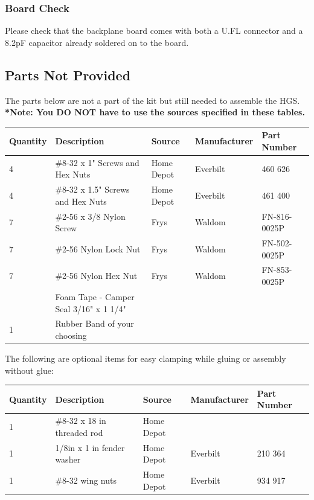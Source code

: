\documentclass[paper=a4,parskip=full+]{scrartcl}
\begin{document}
\subsubsection{Board Check}
Please check that the backplane board comes with both a U.FL connector and a 8.2pF capacitor already soldered on to the board. 

\subsection{Parts Not Provided}
The parts below are not a part of the kit but still needed to assemble the HGS.\\
\textbf{*Note: You DO NOT have to use the sources specified in these tables.}
\begin{table}[H]
    \footnotesize
    \begin{tabular}{|l|l|l|l|l|}
        \hline
        Quantity & Description & Source & Manufacturer & Part Number\\
        \hline
        \hline
        4 & \#8-32 x 1" Screws and Hex Nuts & Home Depot & Everbilt & 460 626 \\
        \hline
        4 & \#8-32 x 1.5" Screws and Hex Nuts & Home Depot & Everbilt & 461 400 \\
        \hline
        7 & \#2-56 x 3/8 Nylon Screw & Frys & Waldom & FN-816-0025P \\
        \hline
        7 & \#2-56 Nylon Lock Nut & Frys & Waldom & FN-502-0025P \\
        \hline
        7 & \#2-56 Nylon Hex Nut & Frys & Waldom & FN-853-0025P \\
        \hline
        & Foam Tape - Camper Seal 3/16" x 1 1/4" & & & \\
        \hline
        1 & Rubber Band of your choosing & & & \\
        \hline
        
    \end{tabular}
    \label{tab:my_label}
\end{table}

\noindent The following are optional items for easy clamping while gluing or assembly without glue:

\begin{table}[H]
    \footnotesize
    \begin{tabular}{|l|l|l|l|l|}
    \hline
    Quantity & Description & Source & Manufacturer & Part Number\\
    \hline
    \hline
    1 & \#8-32 x 18 in threaded rod & Home Depot & & \\
    \hline 
    1 & 1/8in x 1 in fender washer & Home Depot & Everbilt & 210 364 \\
    \hline 
    1 & \#8-32 wing nuts & Home Depot & Everbilt & 934 917 \\
    \hline 
    \end{tabular}
\end{table}
\end{document}
